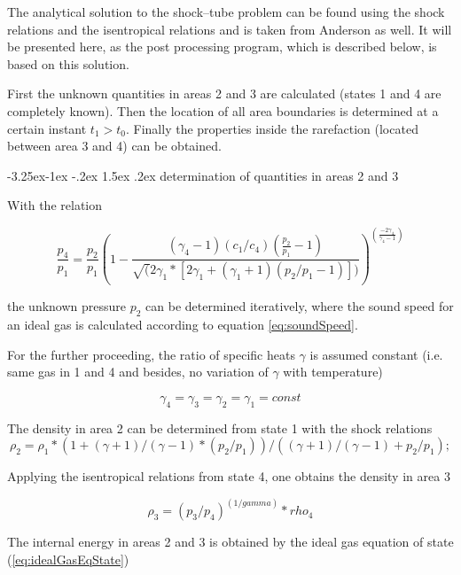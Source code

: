 \documentclass{report}
\makeatletter
\renewcommand\paragraph{\@startsection{paragraph}{4}{\z@}%
  {-3.25ex\@plus -1ex \@minus -.2ex}%
  {1.5ex \@plus .2ex}%
  {\normalfont\normalsize\bfseries}}
\makeatother
\begin{document}
The analytical solution to the shock--tube problem can be found using the shock relations and the isentropical relations and is taken from Anderson \cite{Anderson2002} as well. 
It will be presented here, as the post processing program, which is described below, is based on this solution.

First the unknown quantities in areas 2 and 3 are calculated (states 1 and 4 are completely known). Then the location of all area boundaries is determined at a certain instant $t_1>t_0$. Finally the properties inside the rarefaction (located between area 3 and 4) can be obtained.

\paragraph{determination of quantities in areas 2 and 3}

With the relation

\begin{equation}
 \frac{p_4}{p_1}=\frac{p_2}{p_1}(1-\frac{(\gamma_4-1)(c_1/c_4)(\frac{p_2}{p_1}-1)}{\sqrt(2\gamma_1*[2 \gamma_1+(\gamma_1+1)(p_2/p_1-1)])})^(\frac{-2 \gamma_4}{\gamma_4-1})
\end{equation}

 the unknown pressure $p_2$ can be determined iteratively, where the sound speed for an ideal gas is calculated according to equation \ref{eq:soundSpeed}. 

For the further proceeding, the ratio of specific heats $\gamma$ is assumed constant (i.e. same gas in 1 and 4 and besides, no variation of $\gamma$ with temperature)

\begin{equation}
 \gamma_4= \gamma_3= \gamma_2= \gamma_1=const
\end{equation}

The density in area 2 can be determined from state 1 with the shock relations 
\begin{equation}
 \rho_2=\rho_1*(1+(\gamma+1)/(\gamma-1)*(p_2/p_1))/((\gamma+1)/(\gamma-1)+p_2/p_1);
\end{equation}

Applying the isentropical relations from state 4, one obtains the density in area 3

\begin{equation}
\rho_3=(p_3/p_4)^(1/gamma)*rho_4
\end{equation}

The internal energy in areas 2 and 3 is obtained by the ideal gas equation of state (\ref{eq:idealGasEqState})
\end{document}
